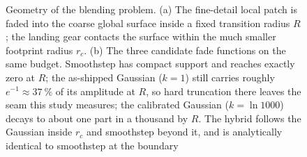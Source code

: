 \begin{figure}[htb]
\caption{Geometry of the blending problem. (a) The fine-detail local patch is
faded into the coarse global surface inside a fixed transition radius $R$; the
landing gear contacts the surface within the much smaller footprint radius
$r_c$. (b) The three candidate fade functions on the same budget. Smoothstep
has compact support and reaches exactly zero at $R$; the as-shipped Gaussian
($k=1$) still carries roughly $e^{-1}\approx\SI{37}{\percent}$ of its amplitude
at $R$, so hard truncation there leaves the seam this study measures; the
calibrated Gaussian ($k=\ln 1000$) decays to about one part in a thousand by
$R$. The hybrid follows the Gaussian inside $r_c$ and smoothstep beyond it, and
is analytically identical to smoothstep at the boundary}
\label{fig:geometry}
\end{figure}
